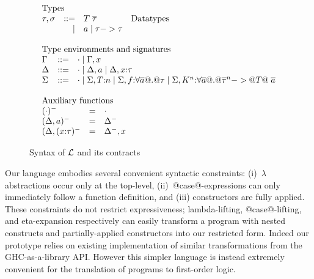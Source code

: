 \begin{figure}
\[\begin{array}{l}
\begin{array}{lrll}
\end{array}
\\ \\
\begin{array}{lrll}
\multicolumn{3}{l}{\text{Types}} \\
\tau,\sigma & ::=  & T\;\taus & \text{Datatypes} \\ 
            & \mid & a \mid \tau -> \tau 
\end{array}
\\ \\
\begin{array}{lrll}
\multicolumn{3}{l}{\text{Type environments and signatures}} \\
\Gamma & ::=  & \cdot \mid \Gamma,x \\
\Delta & ::=  & \cdot \mid \Delta,a \mid \Delta,x{:}\tau \\
\Sigma & ::=  & \cdot \mid \Sigma,T{:}n \mid \Sigma,f{:}\forall\ol{a} @.@ \tau \mid \Sigma,K^{\ar}{:}\forall\ol{a} @.@ \oln{\tau}{\ar} -> @T@\;\as
\end{array}
\\ \\
\begin{array}{lrll}
\multicolumn{3}{l}{\text{Auxiliary functions}} \\
(\cdot)^{-}            & = & \cdot \\
(\Delta,a)^{-}         & = & \Delta^{-} \\
(\Delta,(x{:}\tau)^{-} & = & \Delta^{-},x
\end{array}
\end{array}\] 
\caption{Syntax of $\cal L$ and its contracts}\label{fig:syntax}
\end{figure}

Our language embodies several convenient syntactic constraints: (i)~$\lambda$
abstractions occur only at the top-level, (ii)~@case@-expressions can
only immediately follow a function definition, and (iii) constructors
are fully applied.  These constraints do not restrict expressiveness;
lambda-lifting, @case@-lifting, and eta-expansion respectively can
easily transform a program with nested constructs and
partially-applied constructors into our restricted form.  Indeed our
prototype relies on existing implementation of similar transformations
from the GHC-as-a-library API. However this simpler language is
instead extremely convenient for the translation of programs to
first-order logic.

